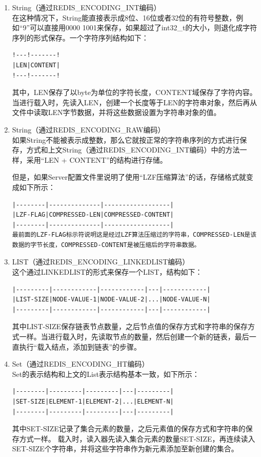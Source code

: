 \documentclass{zjutthesis}
\begin{document}
\begin{enumerate}[label=\arabic*.]

\item{
String（通过REDIS\_ENCODING\_INT编码）\\
在这种情况下，String能直接表示成8位、16位或者32位的有符号整数，例如“9”可以直接用0000 1001来保存，如果超过了int32\_t的大小，则退化成字符序列的形式保存。一个字符序列结构如下：
\begin{verbatim}
!---!-------!
|LEN|CONTENT|
!---!-------!
\end{verbatim}
其中，LEN保存了以byte为单位的字符长度，CONTENT域保存了字符内容。
当进行载入时，先读入LEN，创建一个长度等于LEN的字符串对象，然后再从文件中读取LEN字节数据，并将这些数据设置为字符串对象的值。
}

\item{
String（通过REDIS\_ENCODING\_RAW编码）\\
如果String不能被表示成整数，那么它就按正常的字符串序列的方式进行保存，方式和上文String（通过REDIS\_ENCODING\_INT编码）中的方法一样，采用“LEN + CONTENT”的结构进行存储。

但是，如果Server配置文件里说明了使用“LZF压缩算法”的话，存储格式就变成如下所示：
\begin{verbatim}
|--------|--------------|------------------|
|LZF-FLAG|COMPRESSED-LEN|COMPRESSED-CONTENT|
|--------|--------------|------------------|
最前面的LZF-FLAG标示符说明这是经过LZF算法压缩过的字符串，COMPRESSED-LEN是该数据的字节长度，COMPRESSED-CONTENT是被压缩后的字符串数据。
\end{verbatim}
}

\item{
LIST（通过REDIS\_ENCODING\_LINKEDLIST编码）\\
这个通过LINKEDLIST的形式来保存一个LIST，结构如下：
\begin{verbatim}
|---------|------------|------------|---|------------|
|LIST-SIZE|NODE-VALUE-1|NODE-VALUE-2|...|NODE-VALUE-N|
|---------|------------|------------|---|------------|
\end{verbatim}
其中LIST-SIZE保存链表节点数量，之后节点值的保存方式和字符串的保存方式一样。当进行载入时，先读取节点的数量，然后创建一个新的链表，最后一直执行“载入结点，添加到链表”的步骤。
}

\item{
Set（通过REDIS\_ENCODING\_HT编码）\\
Set的表示结构和上文的List表示结构基本一致，如下所示：
\begin{verbatim}
|--------|---------|---------|---|---------|
|SET-SIZE|ELEMENT-1|ELEMENT-2|...|ELEMENT-N|
|--------|---------|---------|---|---------|
\end{verbatim}
其中SET-SIZE记录了集合元素的数量，之后元素值的保存方式和字符串的保存方式一样。
载入时，读入器先读入集合元素的数量SET-SIZE，再连续读入SET-SIZE个字符串，并将这些字符串作为新元素添加至新创建的集合。
}
\end{enumerate}
\end{document}
